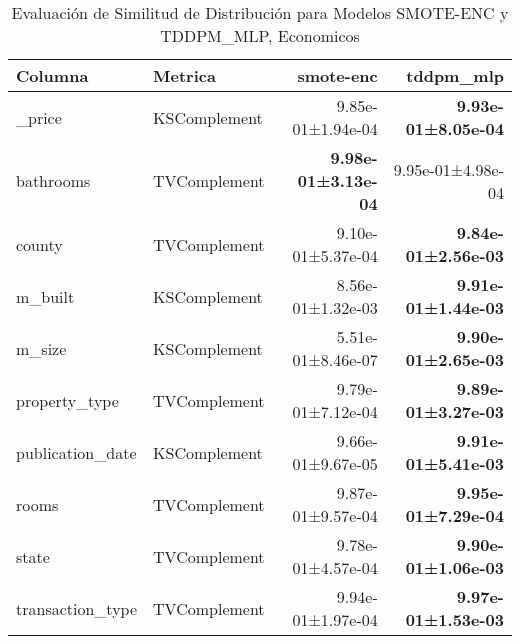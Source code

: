 \begin{table}[H]
\centering
\fontsize{10}{14}\selectfont
\caption{Evaluaci\'on de Similitud de Distribuci\'on para Modelos SMOTE-ENC y TDDPM\_MLP, Economicos}
\label{table-shape-economicos-b}
\begin{tabular}{|l|l|r|r|}
\hline
\rowcolor[gray]{0.8}
Columna & Metrica & smote-enc & tddpm\_mlp \\
\hline \_price & KSComplement & 9.85e-01±1.94e-04 & \bfseries 9.93e-01±8.05e-04 \\
\hline bathrooms & TVComplement & \bfseries 9.98e-01±3.13e-04 & 9.95e-01±4.98e-04 \\
\hline county & TVComplement & 9.10e-01±5.37e-04 & \bfseries 9.84e-01±2.56e-03 \\
\hline m\_built & KSComplement & 8.56e-01±1.32e-03 & \bfseries 9.91e-01±1.44e-03 \\
\hline m\_size & KSComplement & 5.51e-01±8.46e-07 & \bfseries 9.90e-01±2.65e-03 \\
\hline property\_type & TVComplement & 9.79e-01±7.12e-04 & \bfseries 9.89e-01±3.27e-03 \\
\hline publication\_date & KSComplement & 9.66e-01±9.67e-05 & \bfseries 9.91e-01±5.41e-03 \\
\hline rooms & TVComplement & 9.87e-01±9.57e-04 & \bfseries 9.95e-01±7.29e-04 \\
\hline state & TVComplement & 9.78e-01±4.57e-04 & \bfseries 9.90e-01±1.06e-03 \\
\hline transaction\_type & TVComplement & 9.94e-01±1.97e-04 & \bfseries 9.97e-01±1.53e-03 \\
\hline
\end{tabular}
\end{table}
